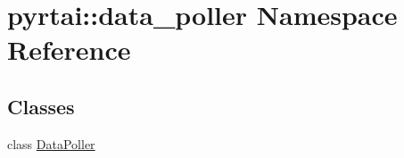 \hypertarget{namespacepyrtai_1_1data__poller}{
\section{pyrtai\-:\-:data\-\_\-poller \-Namespace \-Reference}
\label{namespacepyrtai_1_1data__poller}
}
\subsection*{\-Classes}
\begin{DoxyCompactItemize}
\item 
class \hyperlink{classpyrtai_1_1data__poller_1_1_data_poller}{\-Data\-Poller}
\end{DoxyCompactItemize}
